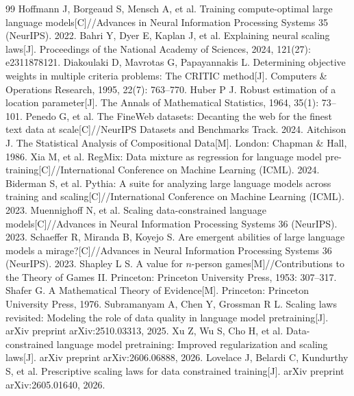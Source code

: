 \begin{thebibliography}{99}\small
{} Hoffmann J, Borgeaud S, Mensch A, et al. Training compute-optimal large language models[C]//Advances in Neural Information Processing Systems 35 (NeurIPS). 2022.
 Bahri Y, Dyer E, Kaplan J, et al. Explaining neural scaling laws[J]. Proceedings of the National Academy of Sciences, 2024, 121(27): e2311878121.
 Diakoulaki D, Mavrotas G, Papayannakis L. Determining objective weights in multiple criteria problems: The CRITIC method[J]. Computers \& Operations Research, 1995, 22(7): 763–770.
 Huber P J. Robust estimation of a location parameter[J]. The Annals of Mathematical Statistics, 1964, 35(1): 73–101.
 Penedo G, et al. The FineWeb datasets: Decanting the web for the finest text data at scale[C]//NeurIPS Datasets and Benchmarks Track. 2024.
 Aitchison J. The Statistical Analysis of Compositional Data[M]. London: Chapman \& Hall, 1986.
 Xia M, et al. RegMix: Data mixture as regression for language model pre-training[C]//International Conference on Machine Learning (ICML). 2024.
 Biderman S, et al. Pythia: A suite for analyzing large language models across training and scaling[C]//International Conference on Machine Learning (ICML). 2023.
 Muennighoff N, et al. Scaling data-constrained language models[C]//Advances in Neural Information Processing Systems 36 (NeurIPS). 2023.
 Schaeffer R, Miranda B, Koyejo S. Are emergent abilities of large language models a mirage?[C]//Advances in Neural Information Processing Systems 36 (NeurIPS). 2023.
 Shapley L S. A value for $n$-person games[M]//Contributions to the Theory of Games II. Princeton: Princeton University Press, 1953: 307–317.
 Shafer G. A Mathematical Theory of Evidence[M]. Princeton: Princeton University Press, 1976.
 Subramanyam A, Chen Y, Grossman R L. Scaling laws revisited: Modeling the role of data quality in language model pretraining[J]. arXiv preprint arXiv:2510.03313, 2025.
 Xu Z, Wu S, Cho H, et al. Data-constrained language model pretraining: Improved regularization and scaling laws[J]. arXiv preprint arXiv:2606.06888, 2026.
 Lovelace J, Belardi C, Kundurthy S, et al. Prescriptive scaling laws for data constrained training[J]. arXiv preprint arXiv:2605.01640, 2026.
\end{thebibliography}
